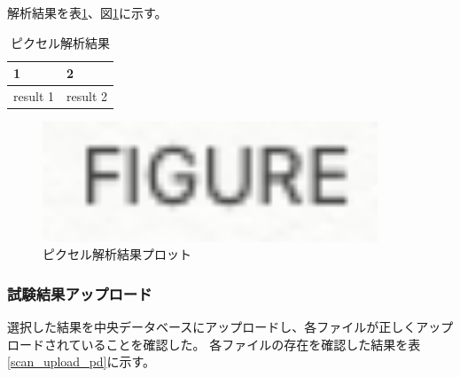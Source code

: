 解析結果を表\ref{pixel_analysis_result}、図\ref{pixel_analysis_result_figure}に示す。
\begin{table}[tbp]
\begin{center}
\caption[ピクセル解析結果]{ピクセル解析結果}
\label{pixel_analysis_result}
  \begin{tabular}{|ll|} \hline
    1 & 2 \\ \hline
    result 1 & result 2 \\ \hline 
  \end{tabular}
\end{center}
\end{table}

\begin{figure}[bpt]\centering
\includegraphics[width=10cm]{figure}
\caption[ピクセル解析結果プロット]{ピクセル解析結果プロット}
\label{pixel_analysis_result_figure}
\end{figure}

\newpage
\subsubsection{試験結果アップロード}
選択した結果を中央データベースにアップロードし、各ファイルが正しくアップロードされていることを確認した。
各ファイルの存在を確認した結果を表\ref{scan_upload_pd}に示す。

